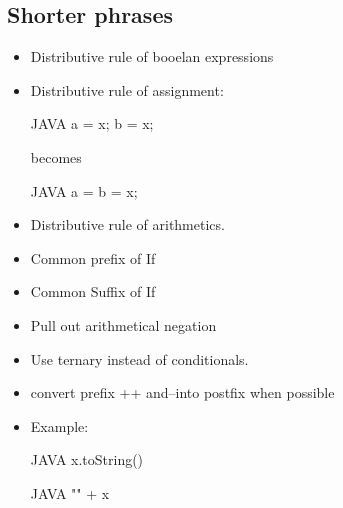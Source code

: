 \subsection{Shorter phrases}
\begin{itemize}
  \item Distributive rule of booelan expressions
  \item Distributive rule of assignment: 
  \begin{code}{JAVA}
a = x; 
b = x;   
  \end{code}
  becomes
    \begin{code}{JAVA}
a = b = x;   
  \end{code}
  \item Distributive rule of arithmetics.
  \item Common prefix of If
  \item Common Suffix of If
  \item Pull out arithmetical negation
  \item Use ternary instead of conditionals.
  \item convert prefix ++ and--into postfix when possible
  \item Example:
\begin{code}{JAVA}
x.toString()
\end{code}
\begin{code}{JAVA}
"" + x
\end{code}
\end{itemize}

